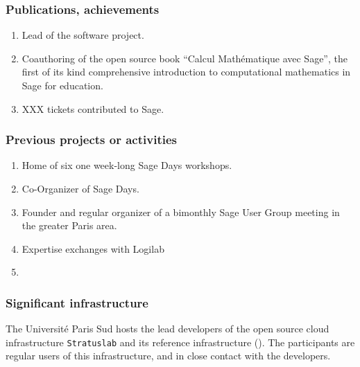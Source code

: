 \subsubsection*{Publications, achievements}


\begin{enumerate}
\item Lead of the \SageCombinat software project.
\item Coauthoring of the open source book ``Calcul Mathématique avec
  Sage'', the first of its kind comprehensive introduction to
  computational mathematics in Sage for education.
\item XXX tickets contributed to Sage.
\end{enumerate}


\subsubsection*{Previous projects or activities}

\begin{enumerate}
\item Home of six one week-long Sage Days workshops.
\item Co-Organizer of  Sage Days.
\item Founder and regular organizer of a bimonthly Sage User Group
  meeting in the greater Paris area.
\item Expertise exchanges with Logilab
\item {}
\end{enumerate}

\subsubsection*{Significant infrastructure}

The Université Paris Sud hosts the lead developers of the open source
cloud infrastructure \texttt{Stratuslab} and its reference
infrastructure (). The participants are regular users
of this infrastructure, and in close contact with the developers.

